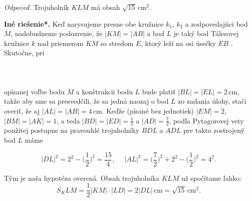 {\textit{Odpoveď.} Trojuholník $KLM$ má obsah $\sqrt{15}$\,cm$^2$.

\textbf{Iné riešenie*.} Keď narysujeme presne obe kružnice $k_1$, $k_2$ a zodpovedajúci bod $M$, nadobudneme podozrenie, že $|KM| = |AB|$ a bod $L$ je taký bod Tálesovej kružnice $k$ nad priemerom $KM$ so stredom $E$, ktorý leží na osi úsečky $EB$ . Skutočne, pri\\
\\
\\
\\
opísanej voľbe bodu $M$ a konštrukcii bodu $L$ bude platiť $|BL| = |EL| = 2$\,cm, takže aby sme sa presvedčili, že sa jedná naozaj o bod $L$ zo zadania úlohy, stačí overiť, že aj $|AL| = |AB| = 4$\,cm. Keďže (písané bez jednotiek) $|EM| = 2$, $|BM| = |AK| = 1$, a teda $|BD| = |ED| =\frac{1}{2}$ a $|AD| =\frac{7}{2}$, podľa Pytagorovej vety použitej postupne na pravouhlé trojuholníky $BDL$ a $ADL$ pre takto zostrojený bod $L$ máme

$$|DL|^2 = 2^2 - \bigg( \frac{1}{2}\bigg)^2=\frac{15}{4}, \ \ \ \ \ \ |AL|^2=\bigg(\frac{7}{2}\bigg)^2+ 2^2 - \bigg(\frac{1}{2}\bigg)^2= 4^2.$$

Tým je naša hypotéza overená. Obsah trojuholníka $KLM$ už spočítame ľahko:
$$S_KLM =\frac{1}{2}|KM| \cdot |LD| = 2|DL|\,\text{cm} =\sqrt{15}\,\text{cm}^2.$$
}
